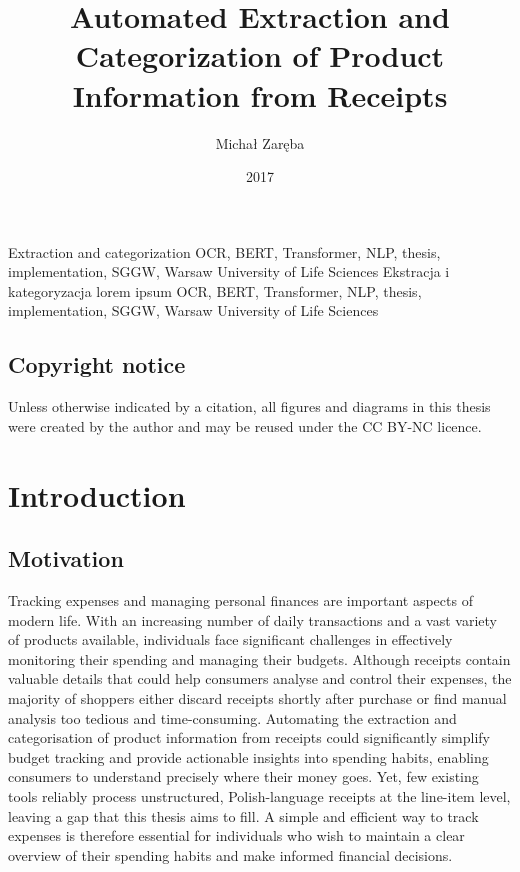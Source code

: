 \documentclass{SGGW-thesis-EN}
\title{Automated Extraction and Categorization of Product Information from Receipts}
\author{Michał Zaręba}
\date{2017}
\begin{document}
\maketitle
\statementpage
\abstractpage
{Extraction and categorization}
{}
{OCR, BERT, Transformer, NLP, thesis, implementation, SGGW, Warsaw University of Life Sciences}
{Ekstracja i kategoryzacja }
{lorem ipsum}
{OCR, BERT, Transformer, NLP, thesis, implementation, SGGW, Warsaw University of Life Sciences}



\tableofcontents

\section*{Copyright notice}
\noindent
Unless otherwise indicated by a citation, all figures and diagrams in this thesis were created by the author and may be reused under the CC BY-NC licence.


\startchapterfromoddpage %

\chapter{Introduction}

\section{Motivation}
Tracking expenses and managing personal finances are important aspects of modern life.
With an increasing number of daily transactions and a vast variety of products available,
individuals face significant challenges in effectively monitoring their spending and managing
their budgets.
Although receipts contain valuable details that could help consumers analyse and control their
expenses, the majority of shoppers either discard receipts shortly after purchase or find manual
analysis too tedious and time-consuming.
Automating the extraction and categorisation of product information from receipts could
significantly simplify budget tracking and provide actionable insights into spending habits,
enabling consumers to understand precisely where their money goes.
Yet, few existing tools reliably process unstructured, Polish-language receipts at the line-item level,
leaving a gap that this thesis aims to fill.
A simple and efficient way to track expenses is therefore essential for individuals who wish to
maintain a clear overview of their spending habits and make informed financial decisions.
\end{document}
